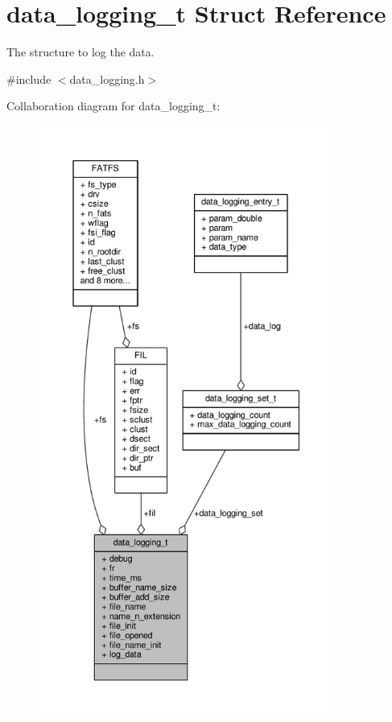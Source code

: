 \hypertarget{structdata__logging__t}{\section{data\+\_\+logging\+\_\+t Struct Reference}
\label{structdata__logging__t}
}


The structure to log the data.  




{\ttfamily \#include $<$data\+\_\+logging.\+h$>$}



Collaboration diagram for data\+\_\+logging\+\_\+t\+:
\nopagebreak
\begin{figure}[H]
\begin{center}
\leavevmode
\includegraphics[height=550pt]{structdata__logging__t__coll__graph}
\end{center}
\end{figure}
